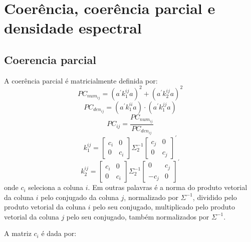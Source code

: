 \documentclass[a4paper,10pt]{article}
\begin{document}
\section{Coerência, coerência parcial e densidade espectral}

\subsection{Coerencia parcial}

A coerência parcial é matricialmente definida por:
\begin{equation}
PC_{num_{ij}} = \left( a^{'} k_{1}^{ij} a \right)^{2} + \left( a^{'} k_{2}^{ij} a \right)^{2}
\end{equation}
\begin{equation}
PC_{den_{ij}} = \left( a^{'} k_{1}^{ii} a \right) \cdot \left( a^{'} k_{1}^{jj} a \right)
\end{equation}
\begin{equation}
PC_{ij} = \frac{PC_{num_{ij}}}{PC_{den_{ij}}}
\end{equation}
\begin{equation}
k_{1}^{ij} = \left[ \begin{array}{cc}
 c_{i} & 0 \\ 0 & c_{i}
\end{array} \right] \Sigma_{2}^{-1} \left[ \begin{array}{cc}
 c_{j} & 0 \\ 0 & c_{j}
\end{array} \right]^{'}
\end{equation}
\begin{equation}
k_{2}^{ij} = \left[ \begin{array}{cc}
 c_{i} & 0 \\ 0 & c_{i}
\end{array} \right] \Sigma_{2}^{-1} \left[ \begin{array}{cc}
 0 & c_{j} \\ -c_{j} & 0
\end{array} \right]^{'} 
\end{equation}
onde $c_i$ seleciona a coluna $i$. Em outras palavras é a norma do produto vetorial da coluna $i$ pelo conjugado da coluna $j$, normalizado por $\Sigma^{-1}$, dividido pelo produto vetorial da coluna $i$ pelo seu conjugado, multiplicado pelo produto vetorial da coluna $j$ pelo seu conjugado, também normalizados por $\Sigma^{-1}$.

A matriz $c_i$ é dada por:
\end{document}
